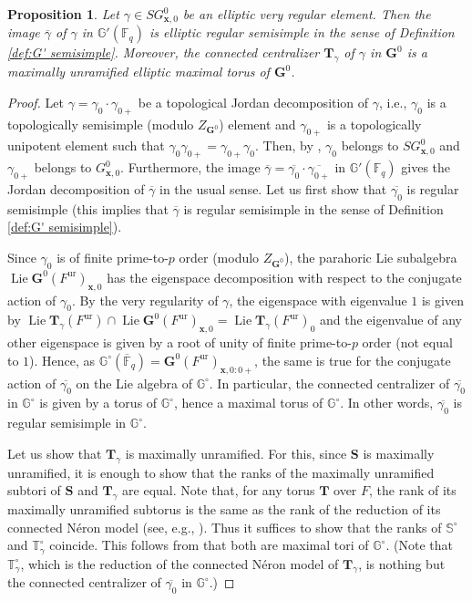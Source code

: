 \documentclass{amsart}
\newcommand{\ur}{\mathrm{ur}}
\newcommand{\bfT}{\mathbf{T}}
\newcommand{\x}{\mathbf{x}}
\newcommand{\F}{\mathbb{F}}
\newcommand{\bbS}{\mathbb{S}}
\newcommand{\bbG}{\mathbb{G}}
\newcommand{\bfG}{\mathbf{G}}
\newcommand{\bfS}{\mathbf{S}}
\DeclareMathOperator{\Lie}{Lie}
\theoremstyle{plain}
\newtheorem{prop}[thm]{Proposition}
\theoremstyle{definition}
\theoremstyle{remark}
\theoremstyle{theorem}
\begin{document}
\begin{prop}\label{prop:evreg-reduction}
Let $\gamma\in SG^{0}_{\x,0}$ be an elliptic very regular element.
Then the image $\overline{\gamma}$ of $\gamma$ in $\bbG'(\F_{q})$ is elliptic regular semisimple in the sense of Definition \ref{def:G' semisimple}.
Moreover, the connected centralizer $\bfT_{\gamma}$ of $\gamma$ in $\bfG^{0}$ is a maximally unramified elliptic maximal torus of $\bfG^{0}$.
\end{prop}

\begin{proof}
Let $\gamma=\gamma_{0}\cdot\gamma_{0+}$ be a topological Jordan decomposition of $\gamma$, i.e., $\gamma_{0}$ is a topologically semisimple (modulo $Z_{\bfG^{0}}$) element and $\gamma_{0+}$ is a topologically unipotent element such that $\gamma_{0}\gamma_{0+}=\gamma_{0+}\gamma_{0}$.
Then, by \cite[Lemma 3.4.22]{Kal19}, $\gamma_{0}$ belongs to $SG^{0}_{\x,0}$ and $\gamma_{0+}$ belongs to $G^{0}_{\x,0}$.
Furthermore, the image $\overline{\gamma}=\overline{\gamma_{0}}\cdot\overline{\gamma_{0+}}$ in $\bbG'(\F_{q})$ gives the Jordan decomposition of $\overline{\gamma}$ in the usual sense.
Let us first show that $\overline{\gamma_{0}}$ is regular semisimple (this implies that $\overline{\gamma}$ is regular semisimple in the sense of Definition \ref{def:G' semisimple}).

Since $\gamma_{0}$ is of finite prime-to-$p$ order (modulo $Z_{\bfG^{0}}$), the parahoric Lie subalgebra $\Lie\bfG^{0}(F^{\ur})_{\x,0}$ has the eigenspace decomposition with respect to the conjugate action of $\gamma_{0}$.
By the very regularity of $\gamma$, the eigenspace with eigenvalue $1$ is given by $\Lie\bfT_{\gamma}(F^{\ur})\cap\Lie\bfG^{0}(F^{\ur})_{\x,0}=\Lie\bfT_{\gamma}(F^{\ur})_{0}$ and the eigenvalue of any other eigenspace is given by a root of unity of finite prime-to-$p$ order (not equal to $1$).
Hence, as $\bbG^{\circ}(\overline{\F}_{q})=\bfG^{0}(F^{\ur})_{\x,0:0+}$, the same is true for the conjugate action of $\overline{\gamma_{0}}$ on the Lie algebra of $\bbG^{\circ}$.
In particular, the connected centralizer of $\overline{\gamma_{0}}$ in $\bbG^{\circ}$ is given by a torus of $\bbG^{\circ}$, hence a maximal torus of $\bbG^{\circ}$.
In other words, $\overline{\gamma_{0}}$ is regular semisimple in $\bbG^{\circ}$.

Let us show that $\bfT_{\gamma}$ is maximally unramified.
For this, since $\bfS$ is maximally unramified, it is enough to show that the ranks of the maximally unramified subtori of $\bfS$ and $\bfT_{\gamma}$ are equal.
Note that, for any torus $\bfT$ over $F$, the rank of its maximally unramified subtorus is the same as the rank of the reduction of its connected N\'eron model (see, e.g., \cite[(Proof of) Proposition 4.6.4]{BT84}).
Thus it suffices to show that the ranks of $\bbS^{\circ}$ and $\mathbb{T}_{\gamma}^{\circ}$ coincide.
This follows from that both are maximal tori of $\bbG^{\circ}$.
(Note that $\mathbb{T}_{\gamma}^{\circ}$, which is the reduction of the connected N\'eron model of $\bfT_{\gamma}$, is nothing but the connected centralizer of $\overline{\gamma_{0}}$ in $\bbG^{\circ}$.)


\end{proof}
\end{document}
